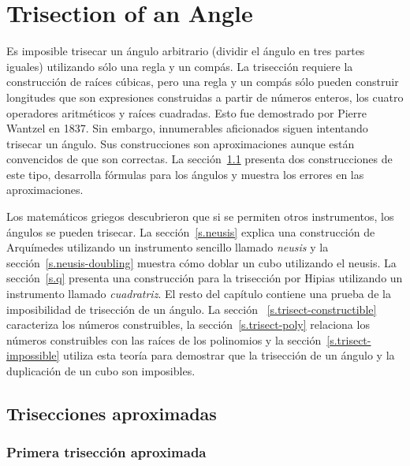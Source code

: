 
\chapter{Trisection of an Angle}\label{c.trisect}


Es imposible trisecar un ángulo arbitrario (dividir el ángulo en tres partes iguales) utilizando sólo una regla y un compás. La trisección requiere la construcción de raíces cúbicas, pero una regla y un compás sólo pueden construir longitudes que son expresiones construidas a partir de números enteros, los cuatro operadores aritméticos y raíces cuadradas. Esto fue demostrado por Pierre Wantzel en 1837. Sin embargo, innumerables aficionados siguen intentando trisecar un ángulo. Sus construcciones son aproximaciones aunque están convencidos de que son correctas. La sección~\ref{s.trisect-approx} presenta dos construcciones de este tipo, desarrolla fórmulas para los ángulos y muestra los errores en las aproximaciones.

Los matemáticos griegos descubrieron que si se permiten otros instrumentos, los ángulos se pueden trisecar. La sección~\ref{s.neusis} explica una construcción de Arquímedes utilizando un instrumento sencillo llamado \emph{neusis} y la sección~\ref{s.neusis-doubling} muestra cómo doblar un cubo utilizando el neusis. La sección~\ref{s.q} presenta una construcción para la trisección por Hipias utilizando un instrumento llamado \emph{cuadratriz}. El resto del capítulo contiene una prueba de la imposibilidad de trisección de un ángulo. La sección ~\ref{s.trisect-constructible} caracteriza los números construibles, la sección~\ref{s.trisect-poly} relaciona los números construibles con las raíces de los polinomios y la sección~\ref{s.trisect-impossible} utiliza esta teoría para demostrar que la trisección de un ángulo y la duplicación de un cubo son imposibles.


\section{Trisecciones aproximadas}\label{s.trisect-approx}

\subsection{Primera trisección aproximada}\label{sub.trisect-approx1}

